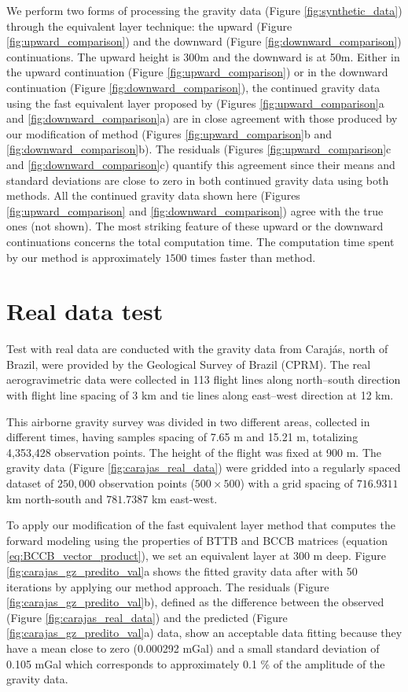 \documentclass[manuscript,revised]{geophysics}
\begin{document}
We perform two forms of processing the gravity data (Figure \ref{fig:synthetic_data}) through the equivalent layer technique: the upward (Figure \ref{fig:upward_comparison}) and the downward (Figure \ref{fig:downward_comparison}) continuations. The upward height is 300m and the downward  is at 50m.   Either in the upward continuation (Figure \ref{fig:upward_comparison}) or in the downward continuation (Figure \ref{fig:downward_comparison}), the continued gravity data using the fast equivalent layer proposed by \citet{siqueira-etal2017} (Figures \ref{fig:upward_comparison}a and \ref{fig:downward_comparison}a) are in close agreement with those produced by our modification of \citet{siqueira-etal2017} method (Figures \ref{fig:upward_comparison}b and \ref{fig:downward_comparison}b). The residuals (Figures \ref{fig:upward_comparison}c and \ref{fig:downward_comparison}c) quantify this agreement since their means and standard deviations are close to zero in both continued gravity data using both methods.  All the continued gravity data shown here (Figures \ref{fig:upward_comparison} and \ref{fig:downward_comparison}) agree with the true ones (not shown). The most striking feature of these upward or the downward continuations concerns the total computation time. The computation time spent by our method is approximately $1500$ times faster than \citet{siqueira-etal2017} method. 


\section{Real data test}
Test with real data are conducted with the gravity data from Caraj\'as, north of Brazil, were provided by the  Geological Survey of Brazil (CPRM). The real aerogravimetric data were collected in 113 flight lines along north–south direction with flight line spacing  of 3 km and tie lines along east–west direction at 12 km.

This airborne gravity survey was divided in two different areas, collected in different times, having samples spacing of 7.65 m and 15.21 m, totalizing  4,353,428 observation points. The height of the flight was fixed at 900 m. The gravity data (Figure \ref{fig:carajas_real_data}) were gridded into a regularly spaced dataset of $250,000$ observation points ($500 \times 500$) with a grid spacing of $716.9311$ km north-south and $781.7387$ km east-west.

To apply our modification of the fast equivalent layer method \citep{siqueira-etal2017}  that computes the forward modeling using the properties of BTTB and BCCB matrices (equation \ref{eq:BCCB_vector_product}), we set an equivalent layer at 300 m deep. Figure \ref{fig:carajas_gz_predito_val}a shows the fitted gravity data after with 50 iterations by applying our method approach. The residuals (Figure \ref{fig:carajas_gz_predito_val}b), defined as the difference between the observed (Figure \ref{fig:carajas_real_data}) and the predicted (Figure \ref{fig:carajas_gz_predito_val}a) data,  show an acceptable data fitting because they have a mean close to zero (0.000292 mGal) and a small standard deviation of 0.105 mGal which corresponds to approximately 0.1 \% of the amplitude of the gravity data.
\end{document}
